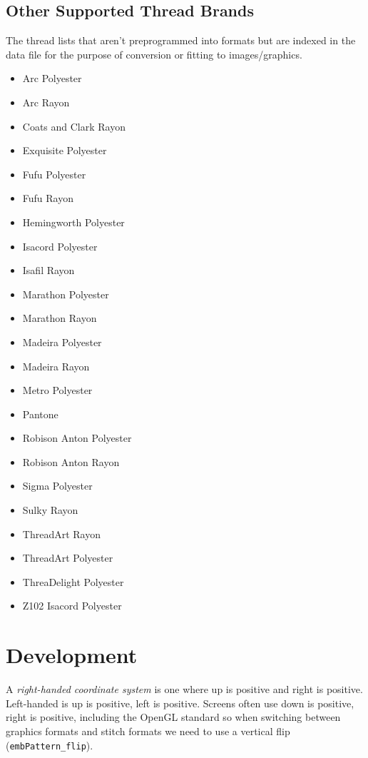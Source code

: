 \documentclass[onesize, a4paper]{refart}
\begin{document}
\subsection{Other Supported Thread Brands}

The thread lists that aren't preprogrammed into formats but
are indexed in the data file for the purpose of conversion
or fitting to images/graphics.

\begin{itemize}
\item Arc Polyester
\item Arc Rayon
\item Coats and Clark Rayon
\item Exquisite Polyester
\item Fufu Polyester
\item Fufu Rayon
\item Hemingworth Polyester
\item Isacord Polyester
\item Isafil Rayon
\item Marathon Polyester
\item Marathon Rayon
\item Madeira Polyester
\item Madeira Rayon
\item Metro Polyester
\item Pantone
\item Robison Anton Polyester
\item Robison Anton Rayon
\item Sigma Polyester
\item Sulky Rayon
\item ThreadArt Rayon
\item ThreadArt Polyester
\item ThreaDelight Polyester
\item Z102 Isacord Polyester
\end{itemize}

\section{Development}

A \emph{right-handed coordinate system} is one where up is positive and right is positive. Left-handed is up is positive, left is positive. Screens often use down is positive, right is positive, including the OpenGL standard so when switching between graphics formats and stitch formats we need to use a vertical flip (\texttt{embPattern\_flip}).
\end{document}
